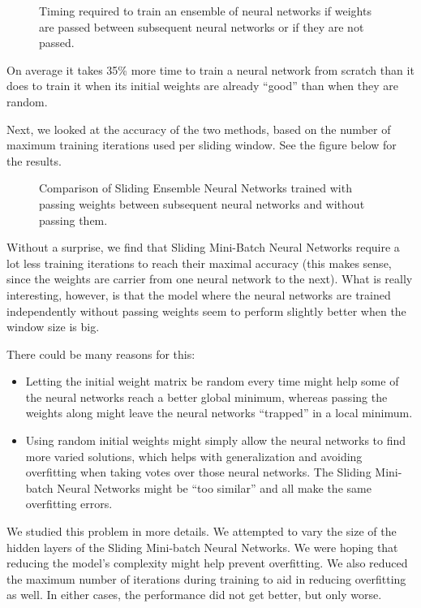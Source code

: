 \documentclass[conference]{IEEEtran}
\begin{document}
		\begin{figure}[H]
			\centering
			\caption{Timing required to train an ensemble of neural networks if weights are passed between subsequent neural networks or if they are not passed.}
			\label{fig:results-nnet-ens-timing}
		\end{figure}
		
		On average it takes 35\% more time to train a neural network from scratch than it does to train it when its initial weights are already ``good'' than when they are random.
		
		Next, we looked at the accuracy of the two methods, based on the number of maximum training iterations used per sliding window. See the figure below for the results.
		\begin{figure}[H]
			\centering
			\caption{Comparison of Sliding Ensemble Neural Networks trained with passing weights between subsequent neural networks and without passing them.}
			\label{fig:benchmark}
		\end{figure}
		
		Without a surprise, we find that Sliding Mini-Batch Neural Networks require a lot less training iterations to reach their maximal accuracy (this makes sense, since the weights are carrier from one neural network to the next). What is really interesting, however, is that the model where the neural networks are trained independently without passing weights seem to perform slightly better when the window size is big.
		
		There could be many reasons for this:
		\begin{itemize}
			\item Letting the initial weight matrix be random every time might help some of the neural networks reach a better global minimum, whereas passing the weights along might leave the neural networks ``trapped'' in a local minimum.
			\item Using random initial weights might simply allow the neural networks to find more varied solutions, which helps with generalization and avoiding overfitting when taking votes over those neural networks. The Sliding Mini-batch Neural Networks might be ``too similar'' and all make the same overfitting errors.
		\end{itemize}
		
		We studied this problem in more details. We attempted to vary the size of the hidden layers of the Sliding Mini-batch Neural Networks. We were hoping that reducing the model's complexity might help prevent overfitting. We also reduced the maximum number of iterations during training to aid in reducing overfitting as well. In either cases, the performance did not get better, but only worse.
		
\end{document}
